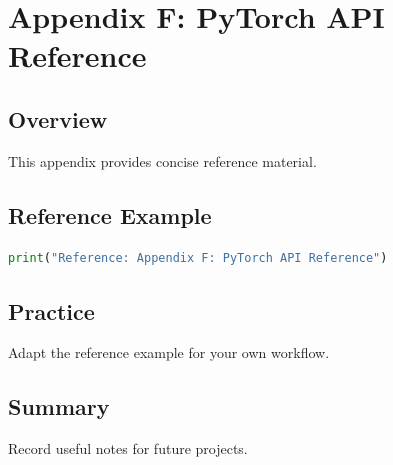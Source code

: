 \chapter{Appendix F: PyTorch API Reference}
\label{chap:vol12-6}



\section{Overview}
This appendix provides concise reference material.

\section{Reference Example}
\begin{lstlisting}[language=Python]
print("Reference: Appendix F: PyTorch API Reference")
\end{lstlisting}

\section{Practice}
\begin{exercise}
Adapt the reference example for your own workflow.
\end{exercise}

\section{Summary}
Record useful notes for future projects.
